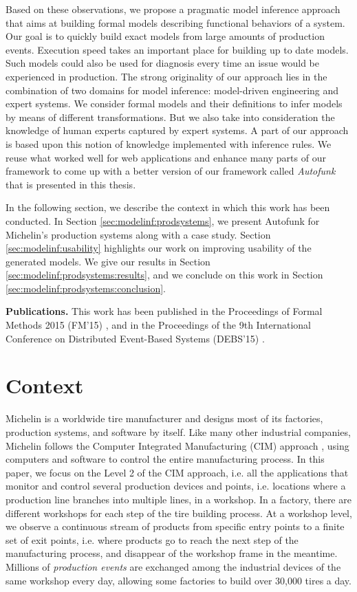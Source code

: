 Based on these observations, we propose a pragmatic model
inference approach that aims at building formal models describing
functional behaviors of a system. Our goal is to quickly build
exact models from large amounts of production events. Execution
speed takes an important place for building up to date models.
Such models could also be used for diagnosis every time an issue
would be experienced in production. The strong originality of our
approach lies in the combination of two domains for model
inference: model-driven engineering and expert systems. We
consider formal models and their definitions to infer models by
means of different transformations. But we also take into
consideration the knowledge of human experts captured by expert
systems. A part of our approach is based upon this notion of
knowledge implemented with inference rules. We reuse what worked
well for web applications and enhance many parts of our framework
to come up with a better version of our framework called
\textit{Autofunk} that is presented in this thesis.

In the following section, we describe the context in which this
work has been conducted. In Section
\ref{sec:modelinf:prodsystems}, we present Autofunk for
Michelin's production systems along with a case study. Section
\ref{sec:modelinf:usability} highlights our work on improving
usability of the generated models.  We give our results in
Section \ref{sec:modelinf:prodsystems:results}, and we conclude
on this work in Section \ref{sec:modelinf:prodsystems:conclusion}.

\textbf{Publications.} This work has been published in the
Proceedings of Formal Methods 2015 (FM'15)
\cite{DBLP:conf/fm/DurandS15}, and in the Proceedings of the 9th
International Conference on Distributed Event-Based Systems
(DEBS'15) \cite{DBLP:conf/debs/SalvaD15}.

\section{Context}

Michelin is a worldwide tire manufacturer and designs most of its
factories, production systems, and software by itself.  Like
many other industrial companies, Michelin follows the Computer
Integrated Manufacturing (CIM) approach \cite{rehg2004computer},
using computers and software to control the entire manufacturing
process. In this paper, we focus on the Level 2 of the CIM
approach, i.e. all the applications that monitor and control
several production devices and points, i.e. locations where a
production line branches into multiple lines, in a workshop. In a
factory, there are different workshops for each step of the tire
building process. At a workshop level, we observe a continuous
stream of products from specific entry points to a finite set of
exit points, i.e. where products go to reach the next step of the
manufacturing process, and disappear of the workshop frame in the
meantime. Millions of \emph{production events} are exchanged
among the industrial devices of the same workshop every day,
allowing some factories to build over 30,000 tires a day.

